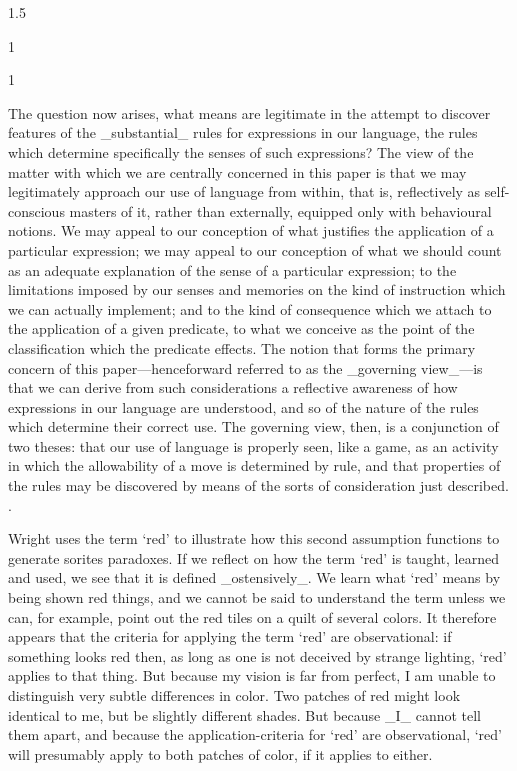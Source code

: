 \documentclass[11pt]{article}
\newenvironment{squote}{%
\begin{spacing}{1}
       	\begin{list}{}{%
\setlength{\labelwidth}{0pt}%
\rightmargin\leftmargin%
}
\item\relax
}{%
\end{list}%
\end{spacing}
}
\begin{document}
\begin{spacing}{1.5}
\begin{squote}
\begin{squote}
The question now arises, what means are legitimate in the attempt to
discover features of the _substantial_ rules for expressions in our
language, the rules which determine specifically the senses of such
expressions?  The view of the matter with which we are centrally
concerned in this paper is that we may legitimately approach our use
of language from within, that is, reflectively as self-conscious
masters of it, rather than externally, equipped only with behavioural
notions.  We may appeal to our conception of what justifies the
application of a particular expression; we may appeal to our
conception of what we should count as an adequate explanation of the
sense of a particular expression; to the limitations imposed by our
senses and memories on the kind of instruction which we can actually
implement; and to the kind of consequence which we attach to the
application of a given predicate, to what we conceive as the point of
the classification which the predicate effects.  The notion that forms
the primary concern of this paper---henceforward referred to as the
_governing view_---is that we can derive from such considerations a
reflective awareness of how expressions in our language are
understood, and so of the nature of the rules which determine their
correct use.  The governing view, then, is a conjunction of two
theses: that our use of language is properly seen, like a game, as an
activity in which the allowability of a move is determined by rule,
and that properties of the rules may be discovered by means of the
sorts of consideration just described. \citep[327]{wright1975}.
\end{squote}

Wright uses the term `red' to illustrate how this second assumption
functions to generate sorites paradoxes.  If we reflect on how the
term `red' is taught, learned and used, we see that it is defined
_ostensively_.  We learn what `red' means by being shown red things,
and we cannot be said to understand the term unless we can, for
example, point out the red tiles on a quilt of several colors.  It
therefore appears that the criteria for applying the term `red' are
observational: if something looks red then, as long as one is not
deceived by strange lighting, `red' applies to that thing.  But
because my vision is far from perfect, I am unable to distinguish very
subtle differences in color.  Two patches of red might look identical
to me, but be slightly different shades.  But because _I_ cannot tell
them apart, and because the
application-criteria for `red' are observational, `red' will
presumably apply to both patches of color, if it applies to either.


\end{squote}
\end{spacing}
\end{document}
